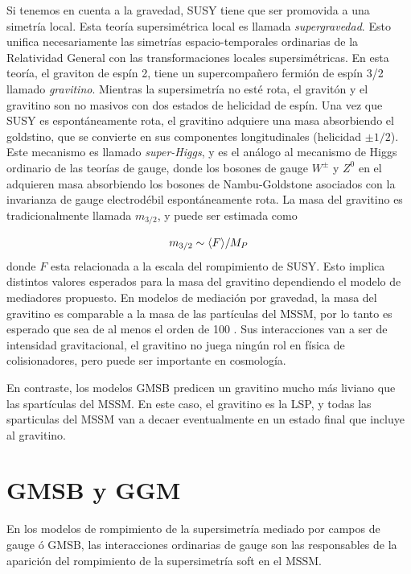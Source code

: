Si tenemos en cuenta a la gravedad, SUSY tiene que ser promovida a una simetría
local. Esta teoría supersimétrica local es llamada \emph{supergravedad}. Esto
unifica necesariamente las simetrías espacio-temporales ordinarias de la
Relatividad General con las transformaciones locales supersimétricas. En esta
teoría, el graviton de espín 2, tiene un supercompa\~nero fermión de espín 3/2
llamado \emph{gravitino}. Mientras la supersimetría no esté rota, el gravitón y
el gravitino son no masivos con dos estados de helicidad de espín. Una vez que
SUSY es espontáneamente rota, el gravitino adquiere una masa absorbiendo el
goldstino, que se convierte en sus componentes longitudinales (helicidad $\pm
1/2$). Este mecanismo es llamado \emph{super-Higgs}, y es el análogo al
mecanismo de Higgs ordinario de las teorías de gauge, donde los bosones de gauge
$W^\pm$ y $Z^0$ en el {\SM} adquieren masa absorbiendo los bosones de
Nambu-Goldstone asociados con la invarianza de gauge electrodébil
espontáneamente rota. La masa del gravitino es tradicionalmente llamada
$m_{3/2}$, y puede ser estimada como

\begin{equation}
  m_{3/2} \sim \langle F \rangle / M_P
\end{equation}
%
donde $F$ esta relacionada a la escala del rompimiento de SUSY. Esto implica
distintos valores esperados para la masa del gravitino dependiendo el modelo de
mediadores propuesto. En modelos de mediación por gravedad, la masa del
gravitino es comparable a la masa de las partículas del MSSM, por lo tanto es
esperado que sea de al menos el orden de 100 \gev. Sus interacciones van a ser
de intensidad gravitacional, el gravitino no juega ningún rol en física de
colisionadores, pero puede ser importante en cosmología.

En contraste, los modelos GMSB predicen un gravitino mucho más liviano que las
spartículas del MSSM.%
En este caso, el gravitino es
la LSP, y todas las sparticulas del MSSM van a decaer eventualmente en un estado
final que incluye al gravitino.


\section{GMSB y GGM} %

En los modelos de rompimiento de la supersimetría mediado por campos de gauge ó
GMSB, las interacciones ordinarias de gauge son las responsables de la aparición
del rompimiento de la supersimetría soft en el MSSM.


